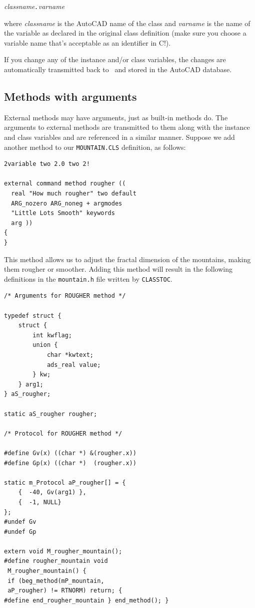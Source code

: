 \documentclass{article}
\begin{document}
{\em classname{\tt .}varname}

where {\em classname} is the AutoCAD name of the class and {\em
varname} is the name of the variable as declared in the original class
definition (make sure you choose a variable name that's acceptable as
an identifier in C!).

If you change any of the instance and/or class variables, the changes
are automatically transmitted back to \cw\ and stored in the AutoCAD
database.

\subsection{Methods with arguments}

External methods may have arguments, just as built-in methods do.  The
arguments to external methods are transmitted to them along with the
instance and class variables and are referenced in a similar manner.
Suppose we add another method to our {\tt MOUNTAIN.CLS} definition, as
follows:

{\small
\begin{verbatim}
2variable two 2.0 two 2!

external command method rougher ((
  real "How much rougher" two default
  ARG_nozero ARG_noneg + argmodes
  "Little Lots Smooth" keywords
  arg ))
{
}
\end{verbatim}
}

This method allows us to adjust the fractal dimension of the
mountains, making them rougher or smoother.  Adding this method will
result in the following definitions in the {\tt mountain.h} file
written by {\tt CLASSTOC}\@.

{\small
\begin{verbatim}
/* Arguments for ROUGHER method */

typedef struct {
    struct {
        int kwflag;
        union {
            char *kwtext;
            ads_real value;
        } kw;
    } arg1;
} aS_rougher;

static aS_rougher rougher;

/* Protocol for ROUGHER method */

#define Gv(x) ((char *) &(rougher.x))
#define Gp(x) ((char *)  (rougher.x))

static m_Protocol aP_rougher[] = {
    {  -40, Gv(arg1) },
    {  -1, NULL}
};
#undef Gv
#undef Gp

extern void M_rougher_mountain();
#define rougher_mountain void
 M_rougher_mountain() {
 if (beg_method(mP_mountain,
 aP_rougher) != RTNORM) return; {
#define end_rougher_mountain } end_method(); }
\end{verbatim}
}
\end{document}
